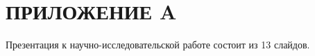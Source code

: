 \chapter*{\hfill{\centering ПРИЛОЖЕНИЕ A}\hfill}

Презентация к научно-исследовательской работе состоит из 13 слайдов.